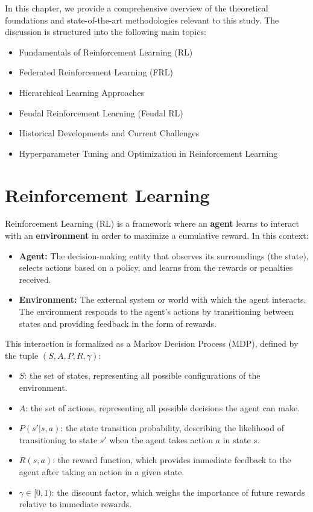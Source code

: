\documentclass[12pt,a4paper,twoside,openany]{book}
\begin{document}
In this chapter, we provide a comprehensive overview of the theoretical foundations and state-of-the-art methodologies relevant to this study. The discussion is structured into the following main topics:
\begin{itemize}
    \item Fundamentals of Reinforcement Learning (RL)
    \item Federated Reinforcement Learning (FRL)
    \item Hierarchical Learning Approaches
    \item Feudal Reinforcement Learning (Feudal RL)
    \item Historical Developments and Current Challenges
    \item Hyperparameter Tuning and Optimization in Reinforcement Learning
\end{itemize}

\section{Reinforcement Learning}

Reinforcement Learning (RL) is a framework where an \textbf{agent} learns to interact with an \textbf{environment} in order to maximize a cumulative reward. In this context:
\begin{itemize}
    \item \textbf{Agent:} The decision-making entity that observes its surroundings (the state), selects actions based on a policy, and learns from the rewards or penalties received.
    \item \textbf{Environment:} The external system or world with which the agent interacts. The environment responds to the agent's actions by transitioning between states and providing feedback in the form of rewards.
\end{itemize}

This interaction is formalized as a Markov Decision Process (MDP), defined by the tuple \( (S, A, P, R, \gamma) \):
\begin{itemize}
    \item \(S\): the set of states, representing all possible configurations of the environment.
    \item \(A\): the set of actions, representing all possible decisions the agent can make.
    \item \(P(s'|s,a)\): the state transition probability, describing the likelihood of transitioning to state \(s'\) when the agent takes action \(a\) in state \(s\).
    \item \(R(s,a)\): the reward function, which provides immediate feedback to the agent after taking an action in a given state.
    \item \(\gamma \in [0,1)\): the discount factor, which weighs the importance of future rewards relative to immediate rewards.
\end{itemize}
\end{document}
